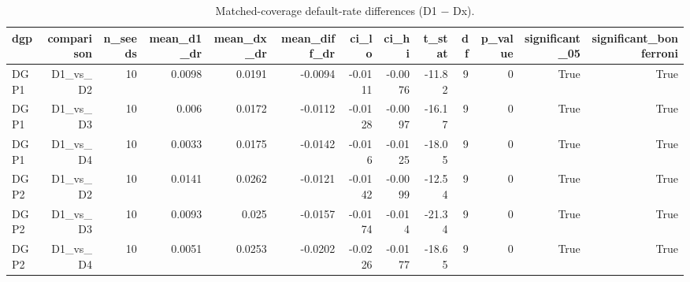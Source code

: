 \begin{table}[htbp]
  \centering
  \caption{Matched-coverage default-rate differences (D1 − Dx).}
  \label{tab:T4_matched_coverage}
  \small
  \begin{tabular}{lrrrrrrrrrrrr}
    \toprule
    dgp & comparison & n\_seeds & mean\_d1\_dr & mean\_dx\_dr & mean\_diff\_dr & ci\_lo & ci\_hi & t\_stat & df & p\_value & significant\_05 & significant\_bonferroni \\
    \midrule
    DGP1 & D1\_vs\_D2 & 10 & 0.0098 & 0.0191 & -0.0094 & -0.0111 & -0.0076 & -11.82 & 9 & 0 & True & True \\
    DGP1 & D1\_vs\_D3 & 10 & 0.006 & 0.0172 & -0.0112 & -0.0128 & -0.0097 & -16.17 & 9 & 0 & True & True \\
    DGP1 & D1\_vs\_D4 & 10 & 0.0033 & 0.0175 & -0.0142 & -0.016 & -0.0125 & -18.05 & 9 & 0 & True & True \\
    DGP2 & D1\_vs\_D2 & 10 & 0.0141 & 0.0262 & -0.0121 & -0.0142 & -0.0099 & -12.54 & 9 & 0 & True & True \\
    DGP2 & D1\_vs\_D3 & 10 & 0.0093 & 0.025 & -0.0157 & -0.0174 & -0.014 & -21.34 & 9 & 0 & True & True \\
    DGP2 & D1\_vs\_D4 & 10 & 0.0051 & 0.0253 & -0.0202 & -0.0226 & -0.0177 & -18.65 & 9 & 0 & True & True \\
    \bottomrule
  \end{tabular}
\end{table}
